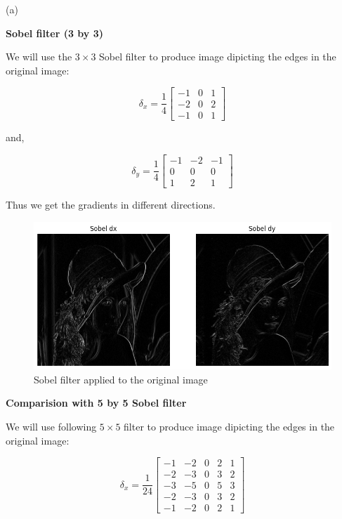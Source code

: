 {\large(a)}

\textbf{Sobel filter (3 by 3)}

We will use the $3\times3$ Sobel filter to produce image dipicting the edges in the original image:

$$\delta_x = \frac{1}{4}
\begin{bmatrix}
-1 & 0 & 1 \\
-2 & 0 & 2 \\
-1 & 0 & 1
\end{bmatrix}$$

and,

$$\delta_y = \frac{1}{4}
\begin{bmatrix}
-1 & -2 & -1 \\
0 & 0 & 0 \\
1 & 2 & 1
\end{bmatrix}$$

Thus we get the gradients in different directions.

\begin{figure}[H]
    \includegraphics[width=1.06\textwidth]{res/2a_sobel.png}
    \caption{Sobel filter applied to the original image}
    \label{fig:2a_sobel}
\end{figure}

\textbf{Comparision with 5 by 5 Sobel filter}

We will use following $5\times5$ filter to produce image dipicting the edges in the original image:

$$\delta_x = \frac{1}{24}
\begin{bmatrix}
-1 & -2 & 0 & 2 & 1 \\
-2 & -3 & 0 & 3 & 2 \\
-3 & -5 & 0 & 5 & 3 \\
-2 & -3 & 0 & 3 & 2 \\
-1 & -2 & 0 & 2 & 1
\end{bmatrix}$$

